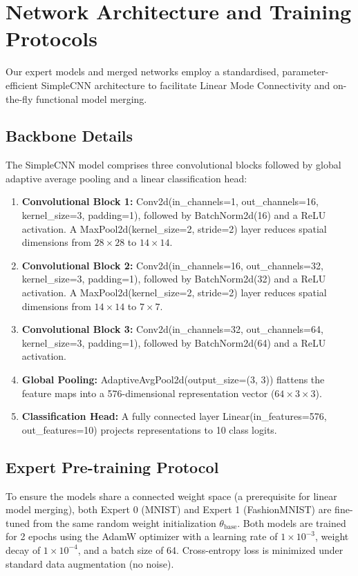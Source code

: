 \documentclass{article}
\theoremstyle{plain}
\theoremstyle{definition}
\theoremstyle{remark}
\begin{document}



\newpage
\appendix
\onecolumn
\section{Network Architecture and Training Protocols}
\label{appendix:architecture}
Our expert models and merged networks employ a standardised, parameter-efficient SimpleCNN architecture to facilitate Linear Mode Connectivity and on-the-fly functional model merging. 

\subsection{Backbone Details}
The SimpleCNN model comprises three convolutional blocks followed by global adaptive average pooling and a linear classification head:
\begin{enumerate}
    \item \textbf{Convolutional Block 1:} Conv2d(in\_channels=1, out\_channels=16, kernel\_size=3, padding=1), followed by BatchNorm2d(16) and a ReLU activation. A MaxPool2d(kernel\_size=2, stride=2) layer reduces spatial dimensions from $28 \times 28$ to $14 \times 14$.
    \item \textbf{Convolutional Block 2:} Conv2d(in\_channels=16, out\_channels=32, kernel\_size=3, padding=1), followed by BatchNorm2d(32) and a ReLU activation. A MaxPool2d(kernel\_size=2, stride=2) layer reduces spatial dimensions from $14 \times 14$ to $7 \times 7$.
    \item \textbf{Convolutional Block 3:} Conv2d(in\_channels=32, out\_channels=64, kernel\_size=3, padding=1), followed by BatchNorm2d(64) and a ReLU activation.
    \item \textbf{Global Pooling:} AdaptiveAvgPool2d(output\_size=(3, 3)) flattens the feature maps into a 576-dimensional representation vector ($64 \times 3 \times 3$).
    \item \textbf{Classification Head:} A fully connected layer Linear(in\_features=576, out\_features=10) projects representations to 10 class logits.
\end{enumerate}

\subsection{Expert Pre-training Protocol}
To ensure the models share a connected weight space (a prerequisite for linear model merging), both Expert 0 (MNIST) and Expert 1 (FashionMNIST) are fine-tuned from the same random weight initialization $\theta_{\text{base}}$. Both models are trained for 2 epochs using the AdamW optimizer with a learning rate of $1 \times 10^{-3}$, weight decay of $1 \times 10^{-4}$, and a batch size of 64. Cross-entropy loss is minimized under standard data augmentation (no noise).
\end{document}
